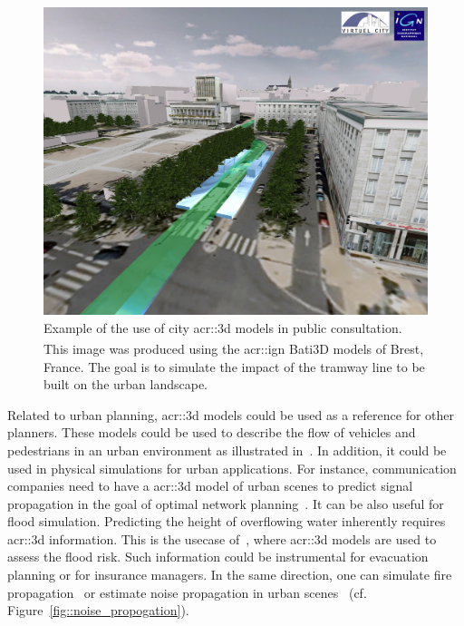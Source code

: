             \begin{figure}[htb]
                \centering
                \includegraphics[width=\textwidth]{images/introduction/3d_model_applications/brest_tramway}
                \caption[
                    Example of the use of city \acrshort*{acr::3d} models in public consultation.
                ]{
                    \label{fig::public_consultation}
                    Example of the use of city \gls{acr::3d} models in public consultation.
                    This image was produced using the \gls{acr::ign} Bati3D\textsuperscript{\textregistered} models of Brest, France.
                    The goal is to simulate the impact of the tramway line to be built on the urban landscape.
                }
            \end{figure}

            Related to urban planning, \gls{acr::3d} models could be used as a reference for other planners.
            These models could be used to describe the flow of vehicles and pedestrians in an urban environment as illustrated in~\parencite{vanhoey2017varcity}.
            In addition, it could be used in physical simulations for urban applications.
            For instance, communication companies need to have a \gls{acr::3d} model of urban scenes to predict signal propagation in the goal of optimal network planning~\parencite{yun2007radio}.
            It can be also useful for flood simulation.
            Predicting the height of overflowing water inherently requires \gls{acr::3d} information.
            This is the usecase of~\textcite{varduhn2015multi}, where \gls{acr::3d} models are used to assess the flood risk.
            Such information could be instrumental for evacuation planning or for insurance managers.
            In the same direction, one can simulate fire propagation~\parencite{dimitropoulos2010fire} or estimate noise propagation in urban scenes~\parencite{stoter20083d} (cf. Figure~\ref{fig::noise_propogation}).\\

